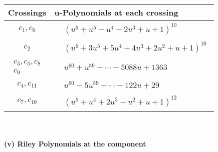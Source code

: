 \documentclass[1p]{elsarticle_modified}
\theoremstyle{definition}
\begin{document}
\begin{tabular}{m{50pt}|m{274pt}}
Crossings & \hspace{64pt}u-Polynomials at each crossing \\
\hline $$\begin{aligned}c_{1},c_{6}\end{aligned}$$&$\begin{aligned}
&(u^6+u^5- u^4-2 u^3+u+1)^{10}
\end{aligned}$\\
\hline $$\begin{aligned}c_{2}\end{aligned}$$&$\begin{aligned}
&(u^6+3 u^5+5 u^4+4 u^3+2 u^2+u+1)^{10}
\end{aligned}$\\
\hline $$\begin{aligned}c_{3},c_{5},c_{8}\\c_{9}\end{aligned}$$&$\begin{aligned}
&u^{60}+u^{59}+\cdots-5088 u+1363
\end{aligned}$\\
\hline $$\begin{aligned}c_{4},c_{11}\end{aligned}$$&$\begin{aligned}
&u^{60}-5 u^{59}+\cdots+122 u+29
\end{aligned}$\\
\hline $$\begin{aligned}c_{7},c_{10}\end{aligned}$$&$\begin{aligned}
&(u^5+u^4+2 u^3+u^2+u+1)^{12}
\end{aligned}$\\
\hline
\end{tabular}\\~\\
\newpage\renewcommand{\arraystretch}{1}
\flushleft \textbf{(v) Riley Polynomials at the component}\newline \\
\end{document}
